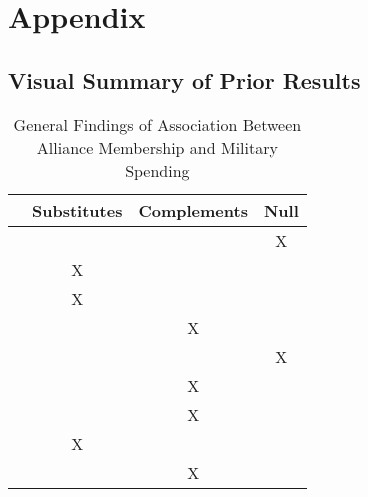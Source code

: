 \documentclass[12pt]{article}
\begin{document}





\section*{Appendix}

\subsection*{Visual Summary of Prior Results} 


\begin{table}[hbt!]
\begin{tabular}{lccc}
     & Substitutes & Complements & Null \\
\hline
\citet{MostSiverson1987} &  &  & X \\
\citet{Morrow1993} & X &  &  \\ 
\citet{Conybeare1994} & X & &  \\
\citet{Diehl1994} &  & X &  \\
\citet{Goldsmith2003} &  &  & X \\
\citet{MorganPalmer2006} &  & X & \\ 
\citet{QuirozFlores2011} &  & X &  \\ 
\citet{DigiuseppePoast2016} & X & & \\ 
\citet{Horowitzetal2017} &  & X & \\ 
\hline
\end{tabular}
\caption{General Findings of Association Between Alliance Membership and Military Spending}
\end{table}





\singlespace


  
% 
\end{document}
